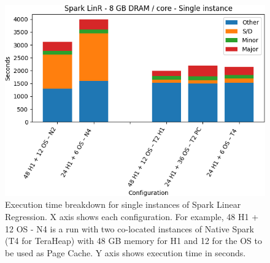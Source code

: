 \begin{figure}[thbp]

    \includegraphics[width=\linewidth]{./fig/linr128_single.png}
    \caption{Execution time breakdown for single instances of Spark
    Linear Regression. X axis shows each configuration.
        For example, 48 H1 + 12 OS - N4 is a run with two co-located instances of Native Spark (T4 for TeraHeap) with 48 GB memory for H1 and 12 for the OS to be used as Page Cache. Y axis shows execution time in seconds.}
    \label{fig:linr128_single}
\end{figure}

